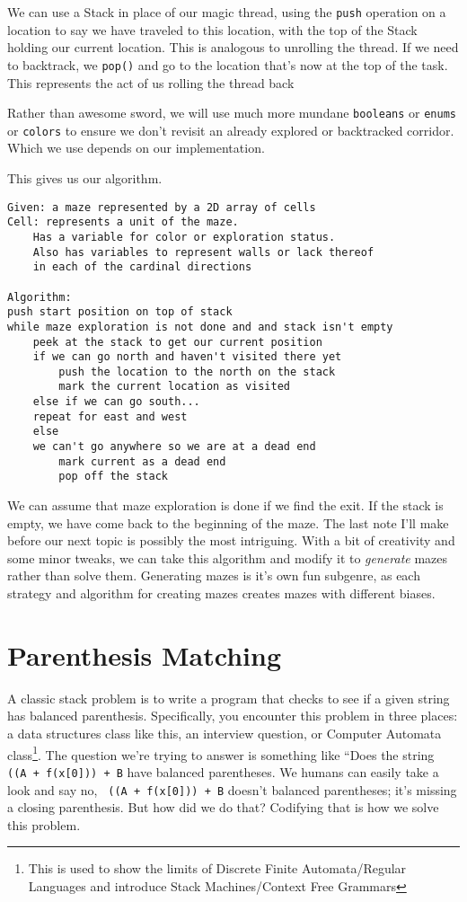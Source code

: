 We can use a Stack in place of our magic thread, using the \texttt{push} operation on a location to say we have traveled to this location, with the top of the Stack holding our current location.  This is analogous to unrolling the thread. If we need to backtrack, we \texttt{pop()} and go to the location that's now at the top of the task.  This represents the act of us rolling the thread back

Rather than awesome sword, we will use much more mundane \texttt{booleans} or \texttt{enums} or \texttt{colors} to ensure we don't revisit an already explored or backtracked corridor.  Which we use depends on our implementation.


This gives us our algorithm.

\begin{verbatim}
Given: a maze represented by a 2D array of cells
Cell: represents a unit of the maze. 
    Has a variable for color or exploration status.
    Also has variables to represent walls or lack thereof
    in each of the cardinal directions

Algorithm:
push start position on top of stack
while maze exploration is not done and and stack isn't empty
    peek at the stack to get our current position
    if we can go north and haven't visited there yet
        push the location to the north on the stack
        mark the current location as visited
    else if we can go south...
    repeat for east and west
    else
    we can't go anywhere so we are at a dead end
        mark current as a dead end
        pop off the stack
\end{verbatim}


We can assume that maze exploration is done if we find the exit.  If the stack is empty, we have come back to the beginning of the maze.  
The last note I'll make before our next topic is possibly the most intriguing.  With a bit of creativity and some minor tweaks, we can take this algorithm and modify it to \textit{generate} mazes rather than solve them. Generating mazes is it's own fun subgenre, as each strategy and algorithm for creating mazes creates mazes with different biases. 


\section{Parenthesis Matching}

A classic stack problem is to write a program that checks to see if a given string has balanced parenthesis.  Specifically, you encounter this problem in three places: a data structures class like this, an interview question, or Computer Automata class\footnote{This is used to show the limits of Discrete Finite Automata/Regular Languages and introduce Stack Machines/Context Free Grammars}.
The  question we're trying to answer is something like ``Does the string \texttt{ ((A + f(x[0])) + B} have balanced parentheses.  We humans can easily take a look and say no, \texttt{ ((A + f(x[0])) + B} doesn't balanced parentheses; it's missing a closing parenthesis.  But how did we do that?  Codifying that is how we solve this problem.  

